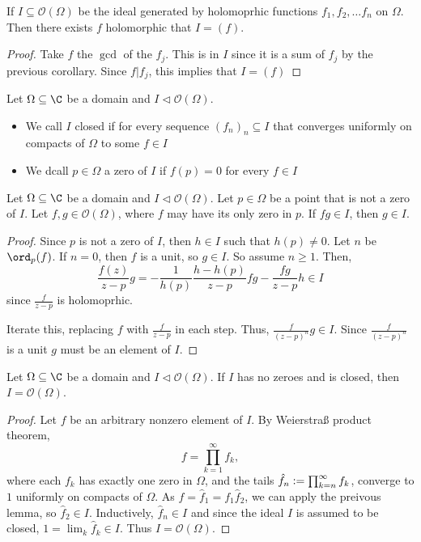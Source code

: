 \begin{izrek}
    If $I \subseteq \mathcal{O}(\Omega)$ be the ideal generated by holomoprhic functions $f_1, f_2, \ldots f_n$ on $\Omega$. Then there exists $f$ holomorphic that $I = (f)$. 
\end{izrek}
\begin{proof}
    Take $f$ the $\gcd$ of the $f_j$. This is in $I$ since it is a sum of $f_j$ by the previous corollary. Since $f | f_j$, this implies that $I = (f)$
\end{proof}

\begin{definicija}
    Let $\Omega \subseteq \C$ be a domain and $I \vartriangleleft \mathcal{O}(\Omega)$.
    \begin{itemize}
        \item We call $I$ closed if for every sequence $(f_n)_n \subseteq I$ that converges uniformly on compacts of $\Omega$ to some $f \in I$
        \item We dcall $p \in \Omega$ a zero of $I$ if $f(p) = 0$ for every $f \in I$
    \end{itemize}
\end{definicija}

\begin{lema}
    Let $\Omega \subseteq \C$ be a domain and $I \vartriangleleft \mathcal{O}(\Omega)$. Let $p \in \Omega$ be a point that is not a zero of $I$. Let $f, g \in \mathcal{O}(\Omega)$, where $f$ may have its only zero in $p$. If $f g \in I$, then $g \in I$.
\end{lema}
\begin{proof}
    Since $p$ is not a zero of $I$, then $h \in I$ such that $h(p) \neq0$. Let $n$ be $\ord_p(f)$. If $n = 0$, then $f$ is a unit, so $g \in I$. So assume $n \geq 1$. Then, 
    $$
        \frac{f(z)}{z - p}g = -\frac{1}{h(p)}\frac{h - h(p)}{z - p} fg - \frac{f g}{z - p} h \in I
    $$
    since $\frac{f}{z - p}$ is holomoprhic.
    
    Iterate this, replacing $f$ with $\frac{f}{z - p}$ in each step. Thus, $\frac{f}{(z - p)^n} g \in I$. Since $\frac{f}{(z - p)^n}$ is a unit $g$ must be an element of $I$.
\end{proof}

\begin{izrek}
    Let $\Omega \subseteq \C$ be a domain and $I \vartriangleleft \mathcal{O}(\Omega)$. If $I$ has no zeroes and is closed, then $I = \mathcal{O}(\Omega)$.
\end{izrek}
\begin{proof}
    Let $f$ be an arbitrary nonzero element of $I$. By Weierstraß product theorem, 
    $$
        f = \prod_{k = 1}^{\infty} f_k,
    $$ 
    where each $f_k$ has exactly one zero in $\Omega$, and the tails $\hat{f}_n \vcentcolon= \prod_{k = n}^{\infty} f_k$, converge to $1$ uniformly on compacts of $\Omega$. As $f = \hat{f}_1 = f_1 \hat{f}_2$, we can apply the preivous lemma, so $\hat{f}_2 \in I$. Inductively, $\hat{f}_n \in I$ and since the ideal $I$ is assumed to be closed, $1 = \lim_k \hat{f}_k \in I$. Thus $I = \mathcal{O}(\Omega)$.
\end{proof}

